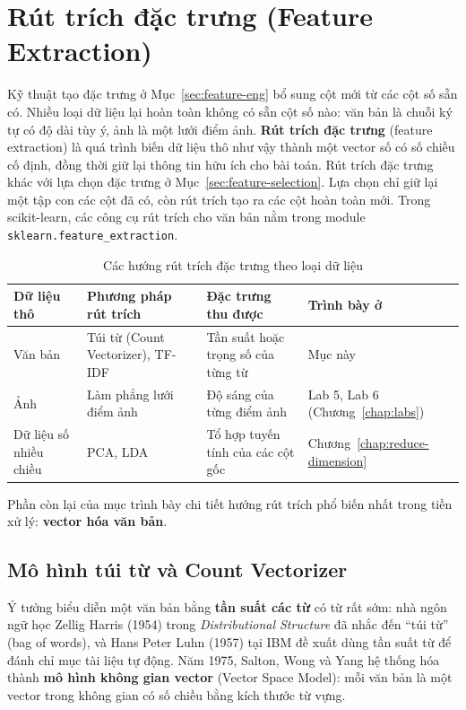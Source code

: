 \section{Rút trích đặc trưng (Feature Extraction)}
\label{sec:feature-extraction}

Kỹ thuật tạo đặc trưng ở Mục~\ref{sec:feature-eng} bổ sung cột mới từ các cột số sẵn có. Nhiều loại dữ liệu lại hoàn toàn không có sẵn cột số nào: văn bản là chuỗi ký tự có độ dài tùy ý, ảnh là một lưới điểm ảnh. \textbf{Rút trích đặc trưng} (feature extraction) là quá trình biến dữ liệu thô như vậy thành một vector số có số chiều cố định, đồng thời giữ lại thông tin hữu ích cho bài toán. Rút trích đặc trưng khác với lựa chọn đặc trưng ở Mục~\ref{sec:feature-selection}. Lựa chọn chỉ giữ lại một tập con các cột đã có, còn rút trích tạo ra các cột hoàn toàn mới. Trong scikit-learn, các công cụ rút trích cho văn bản nằm trong module \texttt{sklearn.feature\_extraction}.

\begin{table}[H]
\centering
\begin{tabular}{|p{2.6cm}|p{4.1cm}|p{3.9cm}|p{2.9cm}|}
\hline
\textbf{Dữ liệu thô} & \textbf{Phương pháp rút trích} & \textbf{Đặc trưng thu được} & \textbf{Trình bày ở} \\
\hline
Văn bản & Túi từ (Count Vectorizer), TF-IDF & Tần suất hoặc trọng số của từng từ & Mục này \\ \hline
Ảnh & Làm phẳng lưới điểm ảnh & Độ sáng của từng điểm ảnh & Lab 5, Lab 6 (Chương~\ref{chap:labs}) \\ \hline
Dữ liệu số nhiều chiều & PCA, LDA & Tổ hợp tuyến tính của các cột gốc & Chương~\ref{chap:reduce-dimension} \\ \hline
\end{tabular}
\caption{Các hướng rút trích đặc trưng theo loại dữ liệu}
\label{tab:feature-extraction}
\end{table}

Phần còn lại của mục trình bày chi tiết hướng rút trích phổ biến nhất trong tiền xử lý: \textbf{vector hóa văn bản}.

\subsection{Mô hình túi từ và Count Vectorizer}

Ý tưởng biểu diễn một văn bản bằng \textbf{tần suất các từ} có từ rất sớm: nhà ngôn ngữ học Zellig Harris (1954) trong \textit{Distributional Structure} đã nhắc đến ``túi từ'' (bag of words), và Hans Peter Luhn (1957) tại IBM đề xuất dùng tần suất từ để đánh chỉ mục tài liệu tự động. Năm 1975, Salton, Wong và Yang hệ thống hóa thành \textbf{mô hình không gian vector} (Vector Space Model): mỗi văn bản là một vector trong không gian có số chiều bằng kích thước từ vựng.

